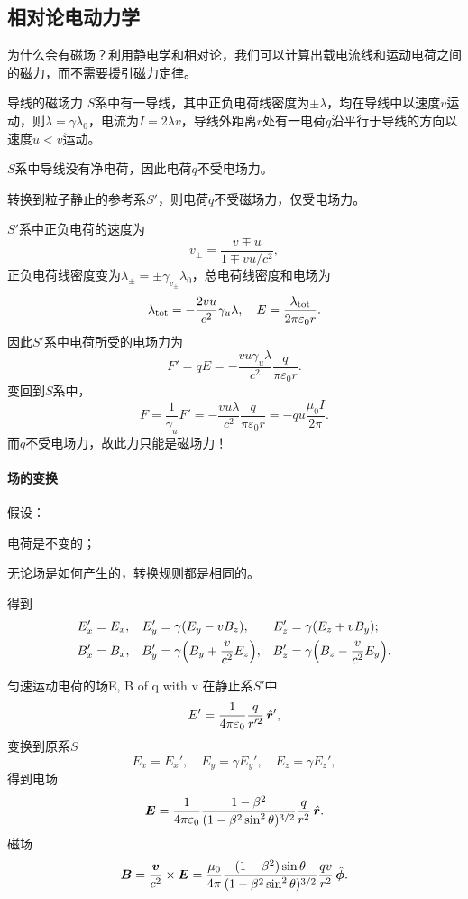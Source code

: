 \subsection{相对论电动力学}
为什么会有磁场？利用静电学和相对论，我们可以计算出载电流线和运动电荷之间的磁力，而不需要援引磁力定律。
\begin{example}{导线的磁场力}{}
    $S$系中有一导线，其中正负电荷线密度为$\pm\lambda$，均在导线中以速度$v$运动，则$\lambda=\gamma\lambda_0$，电流为$I=2\lambda v$，导线外距离$r$处有一电荷$q$沿平行于导线的方向以速度$u<v$运动。

    $S$系中导线没有净电荷，因此电荷$q$不受电场力。

    转换到粒子静止的参考系$S'$，则电荷$q$不受磁场力，仅受电场力。
    
    $S'$系中正负电荷的速度为
    \[
        v_\pm=\frac{v\mp u}{1\mp vu/c^2},
    \]
    正负电荷线密度变为$\lambda_\pm=\pm\gamma_{v_\pm}\lambda_0$，总电荷线密度和电场为
    \[
        \lambda_\mathrm{tot}=-\frac{2vu}{c^2}\gamma_u\lambda,\quad E=\frac{\lambda_\mathrm{tot}}{2\pi\varepsilon_0r}.
    \]
    因此$S'$系中电荷所受的电场力为
    \[
        F'=qE=-\frac{vu\gamma_u\lambda}{c^2}\frac q{\pi\varepsilon_0r}.
    \]
    变回到$S$系中，
    \[
        F=\frac1{\gamma_u}F'=-\frac{vu\lambda}{c^2}\frac q{\pi\varepsilon_0r}=-qu\frac{\mu_0I}{2\pi}.
    \]
    而$q$不受电场力，故此力只能是磁场力！
\end{example}
\paragraph{场的变换}
假设：
\begin{compactenum}
	\item 电荷是不变的；
	\item 无论场是如何产生的，转换规则都是相同的。
\end{compactenum}
得到
\begin{align}
    E_x'&=E_x,&E_y'&=\gamma(E_y-vB_z),&E_z'&=\gamma(E_z+vB_y);\\
    B_x'&=B_x,&B_y'&=\gamma\Bigl(B_y+\frac v{c^2}E_z\Bigr),&B_z'&=\gamma\Bigl(B_z-\frac v{c^2}E_y\Bigr).
\end{align}
\begin{example}{匀速运动电荷的场}{E, B of q with v}
    在静止系$S'$中
    \[
        E'=\frac1{4\pi\varepsilon_0}\frac q{r'^2}\mathop{}\!\hat{\bm r}',
    \]
    变换到原系$S$
    \[
        E_x=E_x',\quad E_y=\gamma E_y',\quad E_z=\gamma E_z',
    \]
    得到电场 
    \begin{equation}
        \bm E=\frac1{4\pi\varepsilon_0}\frac{1-\beta^2}{(1-\beta^2\sin^2\theta)^{3/2}}\frac q{r^2}\mathop{}\!\hat{\bm r}.
    \end{equation}
    磁场 
    \begin{equation}
        \bm B=\frac{\bm v}{c^2}\times\bm E=\frac{\mu_0}{4\pi}\frac{(1-\beta^2)\sin\theta}{(1-\beta^2\sin^2\theta)^{3/2}}\frac{qv}{r^2}\mathop{}\!\hat{\bm \phi}.
    \end{equation}
\end{example}
